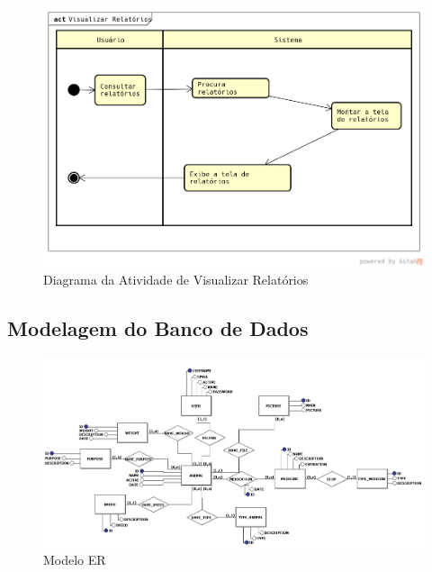 \documentclass[12pt]{article}
\begin{document}
\begin{titlepage}
\begin{figure}[!h]
\begin{center}
\end{center}
\end{figure}

\newpage

\begin{figure}[!h]
\begin{center}
\caption{Diagrama da Atividade de Visualizar Relatórios}
\includegraphics[width=6in]{img/atividaderelatorios.png}

\end{center}
\end{figure}

\newpage

\subsection{Modelagem do Banco de Dados}

\begin{figure}[!h]
\begin{center}
\caption{Modelo ER}
\includegraphics[width=6in]{img/erdoboi.jpeg}


\end{center}
\end{figure}
\end{titlepage}
\end{document}

